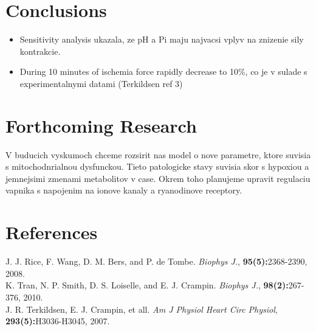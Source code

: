 \documentclass[a0,portrait]{a0poster}
\begin{document}
\begin{multicols}{2}
\color{SaddleBrown} %

\section*{Conclusions}

\begin{itemize}

\item Sensitivity analysis ukazala, ze pH a Pi maju najvacsi vplyv
    na znizenie sily kontrakcie.

\item During 10 minutes of ischemia force rapidly decrease to 10\%, co je
    v sulade s experimentalnymi datami (Terkildsen ref 3)

\end{itemize}




\color{DarkSlateGray} %


\section*{Forthcoming Research}

V buducich vyskumoch chceme rozsirit nas model o nove parametre, ktore suvisia s 
mitochodnrialnou dysfunckou. Tieto patologicke stavy suvisia skor 
s hypoxiou a jemnejsimi zmenami metabolitov v case. Okrem toho planujeme upravit
regulaciu vapnika s napojenim na ionove kanaly a ryanodinove receptory.

\section*{References}

J. J. Rice, F. Wang, D. M. Bers, and P. de Tombe. \textit{Biophys J.}, \textbf{95(5):}2368-2390, 2008.\\
K. Tran, N. P. Smith, D. S. Loiselle, and E. J. Crampin. \textit{Biophys J.}, \textbf{98(2):}267-376, 2010.\\
J. R. Terkildsen, E. J. Crampin, et all. \textit{Am J Physiol Heart Circ Physiol}, \textbf{293(5):}H3036-H3045, 2007.


\end{multicols}
\end{document}
